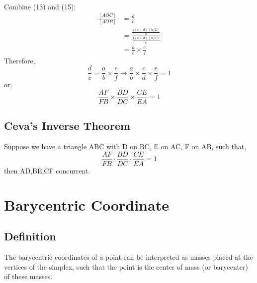 \documentclass{article}
\begin{document}
\\
Combine (13) and (15):\\
\begin{align*}
    \frac{[AOC]}{[AOB]}&=\frac{d}{c}\\
    &=\frac{\frac{a(c+d)(h/2)}{b}}{\frac{f(c+d)(h/2)}{e}}\\
    &=\frac{a}{b}\times\frac{e}{f}
\end{align*}
Therefore,
$$\frac{d}{c}=\frac{a}{b}\times\frac{e}{f}\longrightarrow\frac{a}{b}\times\frac{c}{d}\times\frac{e}{f}=1$$
or,
$$\frac{AF}{FB}\times \frac{BD}{DC} \times \frac{CE}{EA}=1$$
\vspace{200px}

\subsection{Ceva's Inverse Theorem}

Suppose we have a triangle ABC with D on BC, E on AC, F on AB, such that,
$$\frac{AF}{FB}\cdot \frac{BD}{DC} \cdot \frac{CE}{EA}=1$$
then AD,BE,CF concurrent.

\section{Barycentric Coordinate}
\subsection{Definition}
The barycentric coordinates of a point can be interpreted as masses placed at the vertices of the simplex, such that the point is the center of mass (or barycenter) of these masses.



\end{document}
